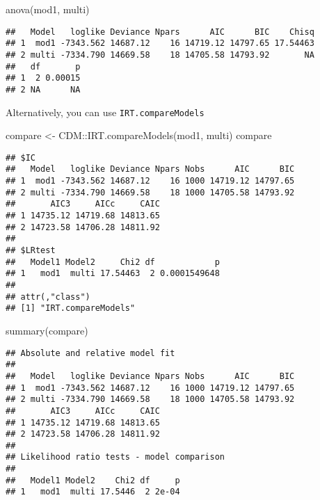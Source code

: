 \documentclass[
]{book}
\newenvironment{Shaded}{\begin{snugshade}}{\end{snugshade}}
\newcommand{\FunctionTok}[1]{\textcolor[rgb]{0.00,0.00,0.00}{#1}}
\newcommand{\NormalTok}[1]{#1}
\newcommand{\OtherTok}[1]{\textcolor[rgb]{0.56,0.35,0.01}{#1}}
\newcommand{\SpecialCharTok}[1]{\textcolor[rgb]{0.00,0.00,0.00}{#1}}
\begin{document}
\begin{Shaded}
\begin{Highlighting}[]
\FunctionTok{anova}\NormalTok{(mod1, multi)}
\end{Highlighting}
\end{Shaded}

\begin{verbatim}
##   Model   loglike Deviance Npars      AIC      BIC    Chisq
## 1  mod1 -7343.562 14687.12    16 14719.12 14797.65 17.54463
## 2 multi -7334.790 14669.58    18 14705.58 14793.92       NA
##   df       p
## 1  2 0.00015
## 2 NA      NA
\end{verbatim}

Alternatively, you can use \texttt{IRT.compareModels}

\begin{Shaded}
\begin{Highlighting}[]
\NormalTok{compare }\OtherTok{\textless{}{-}}\NormalTok{ CDM}\SpecialCharTok{::}\FunctionTok{IRT.compareModels}\NormalTok{(mod1, multi)}
\NormalTok{compare}
\end{Highlighting}
\end{Shaded}

\begin{verbatim}
## $IC
##   Model   loglike Deviance Npars Nobs      AIC      BIC
## 1  mod1 -7343.562 14687.12    16 1000 14719.12 14797.65
## 2 multi -7334.790 14669.58    18 1000 14705.58 14793.92
##       AIC3     AICc     CAIC
## 1 14735.12 14719.68 14813.65
## 2 14723.58 14706.28 14811.92
## 
## $LRtest
##   Model1 Model2     Chi2 df            p
## 1   mod1  multi 17.54463  2 0.0001549648
## 
## attr(,"class")
## [1] "IRT.compareModels"
\end{verbatim}

\begin{Shaded}
\begin{Highlighting}[]
\FunctionTok{summary}\NormalTok{(compare)}
\end{Highlighting}
\end{Shaded}

\begin{verbatim}
## Absolute and relative model fit
## 
##   Model   loglike Deviance Npars Nobs      AIC      BIC
## 1  mod1 -7343.562 14687.12    16 1000 14719.12 14797.65
## 2 multi -7334.790 14669.58    18 1000 14705.58 14793.92
##       AIC3     AICc     CAIC
## 1 14735.12 14719.68 14813.65
## 2 14723.58 14706.28 14811.92
## 
## Likelihood ratio tests - model comparison 
## 
##   Model1 Model2    Chi2 df     p
## 1   mod1  multi 17.5446  2 2e-04
\end{verbatim}
\end{document}
